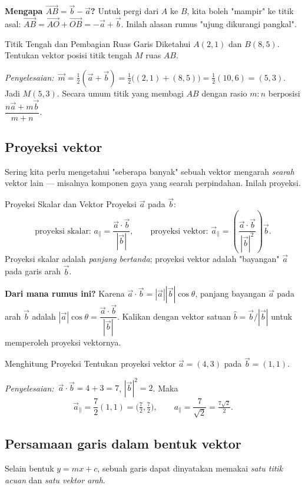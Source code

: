 \documentclass[11pt,a4paper]{report}
\theoremstyle{gaya}
\newcommand{\jawab}{\par\smallskip\noindent\textit{\textcolor{oranye}{Penyelesaian:}}\ }
\begin{document}
\textbf{Mengapa $\vec{AB}=\vec b-\vec a$?} Untuk pergi dari $A$ ke $B$, kita boleh "mampir" ke titik asal: $\vec{AB}=\vec{AO}+\vec{OB}=-\vec a+\vec b$. Inilah alasan rumus "ujung dikurangi pangkal".

\begin{contoh}{Titik Tengah dan Pembagian Ruas Garis}
Diketahui $A(2,1)$ dan $B(8,5)$. Tentukan vektor posisi titik tengah $M$ ruas $AB$.

\jawab $\vec m=\tfrac12(\vec a+\vec b)=\tfrac12\big((2,1)+(8,5)\big)=\tfrac12(10,6)=(5,3)$. Jadi $M(5,3)$. Secara umum titik yang membagi $AB$ dengan rasio $m:n$ berposisi $\dfrac{n\vec a+m\vec b}{m+n}$.
\end{contoh}

\subsection*{Proyeksi vektor}
Sering kita perlu mengetahui "seberapa banyak" sebuah vektor mengarah \emph{searah} vektor lain --- misalnya komponen gaya yang searah perpindahan. Inilah proyeksi.

\begin{konsep}{Proyeksi Skalar dan Vektor}
Proyeksi $\vec a$ pada $\vec b$:
\[
\text{proyeksi skalar: } a_{\parallel}=\frac{\vec a\cdot\vec b}{|\vec b|},\qquad
\text{proyeksi vektor: } \vec a_{\parallel}=\left(\frac{\vec a\cdot\vec b}{|\vec b|^2}\right)\vec b .
\]
Proyeksi skalar adalah \emph{panjang bertanda}; proyeksi vektor adalah "bayangan" $\vec a$ pada garis arah $\vec b$.
\end{konsep}

\textbf{Dari mana rumus ini?} Karena $\vec a\cdot\vec b=|\vec a||\vec b|\cos\theta$, panjang bayangan $\vec a$ pada arah $\vec b$ adalah $|\vec a|\cos\theta=\dfrac{\vec a\cdot\vec b}{|\vec b|}$. Kalikan dengan vektor satuan $\hat b=\vec b/|\vec b|$ untuk memperoleh proyeksi vektornya.

\begin{contoh}{Menghitung Proyeksi}
Tentukan proyeksi vektor $\vec a=(4,3)$ pada $\vec b=(1,1)$.

\jawab $\vec a\cdot\vec b=4+3=7$, $|\vec b|^2=2$. Maka
\[
\vec a_{\parallel}=\frac{7}{2}(1,1)=\Big(\tfrac72,\tfrac72\Big),\qquad
a_{\parallel}=\frac{7}{\sqrt2}=\tfrac{7\sqrt2}{2}.
\]
\end{contoh}

\subsection*{Persamaan garis dalam bentuk vektor}
Selain bentuk $y=mx+c$, sebuah garis dapat dinyatakan memakai \emph{satu titik acuan} dan \emph{satu vektor arah}.
\end{document}
